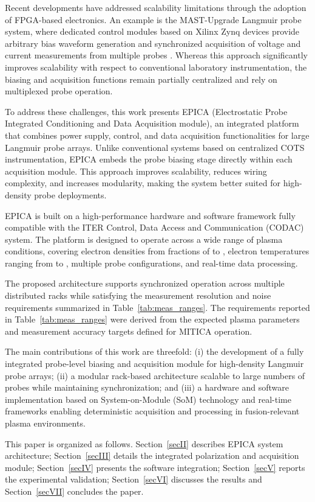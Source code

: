 Recent developments have addressed scalability limitations through the adoption of FPGA-based electronics. An example is the MAST-Upgrade Langmuir probe system, where dedicated control modules based on Xilinx Zynq devices provide arbitrary bias waveform generation and synchronized acquisition of voltage and current measurements from multiple probes \cite{Ryan}. Whereas this approach significantly improves scalability with respect to conventional laboratory instrumentation, the biasing and acquisition functions remain partially centralized and rely on multiplexed probe operation.

To address these challenges, this work presents EPICA (Electrostatic Probe Integrated Conditioning and Data Acquisition module), an integrated platform that combines power supply, control, and data acquisition functionalities for large Langmuir probe arrays. Unlike conventional systems based on centralized COTS instrumentation, EPICA embeds the probe biasing stage directly within each acquisition module. This approach improves scalability, reduces wiring complexity, and increases modularity, making the system better suited for high-density probe deployments.

EPICA is built on a high-performance hardware and software framework fully compatible with the ITER Control, Data Access and Communication (CODAC) system. The platform is designed to operate across a wide range of plasma conditions, covering electron densities from fractions of  to , electron temperatures ranging from  to , multiple probe configurations, and real-time data processing.

The proposed architecture supports synchronized operation across multiple distributed racks while satisfying the measurement resolution and noise requirements summarized in Table~\ref{tab:meas_ranges}. The requirements reported in Table~\ref{tab:meas_ranges} were derived from the expected plasma parameters and measurement accuracy targets defined for MITICA operation.

The main contributions of this work are threefold: (i) the development of a fully integrated probe-level biasing and acquisition module for high-density Langmuir probe arrays; (ii) a modular rack-based architecture scalable to large numbers of probes while maintaining synchronization; and (iii) a hardware and software implementation based on System-on-Module (SoM) technology and real-time frameworks enabling deterministic acquisition and processing in fusion-relevant plasma environments.

This paper is organized as follows. Section~\ref{secII} describes EPICA system architecture; Section~\ref{secIII} details the integrated polarization and acquisition module; Section~\ref{secIV} presents the software integration; Section~\ref{secV} reports the experimental validation; Section~\ref{secVI} discusses the results and Section~\ref{secVII} concludes the paper.